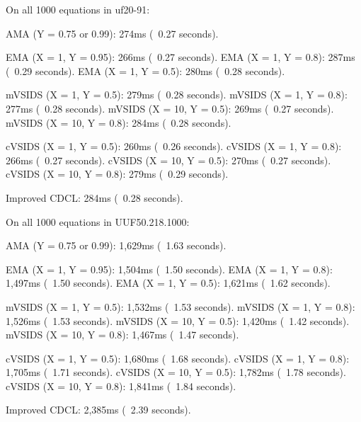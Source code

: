\begin{FVerbatim}
On all 1000 equations in uf20-91:

AMA (Y = 0.75 or 0.99):     274ms (~0.27 seconds).

EMA (X = 1, Y = 0.95):      266ms (~0.27 seconds).
EMA (X = 1, Y = 0.8):       287ms (~0.29 seconds).
EMA (X = 1, Y = 0.5):       280ms (~0.28 seconds).

mVSIDS (X = 1, Y = 0.5):    279ms (~0.28 seconds).
mVSIDS (X = 1, Y = 0.8):    277ms (~0.28 seconds).
mVSIDS (X = 10, Y = 0.5):   269ms (~0.27 seconds).
mVSIDS (X = 10, Y = 0.8):   284ms (~0.28 seconds).

cVSIDS (X = 1, Y = 0.5):    260ms (~0.26 seconds).
cVSIDS (X = 1, Y = 0.8):    266ms (~0.27 seconds).
cVSIDS (X = 10, Y = 0.5):   270ms (~0.27 seconds).
cVSIDS (X = 10, Y = 0.8):   279ms (~0.29 seconds).

Improved CDCL:              284ms (~0.28 seconds).

On all 1000 equations in UUF50.218.1000:

AMA (Y = 0.75 or 0.99):     1,629ms (~1.63 seconds).

EMA (X = 1, Y = 0.95):      1,504ms (~1.50 seconds).
EMA (X = 1, Y = 0.8):       1,497ms (~1.50 seconds).
EMA (X = 1, Y = 0.5):       1,621ms (~1.62 seconds).

mVSIDS (X = 1, Y = 0.5):    1,532ms (~1.53 seconds).
mVSIDS (X = 1, Y = 0.8):    1,526ms (~1.53 seconds).
mVSIDS (X = 10, Y = 0.5):   1,420ms (~1.42 seconds).
mVSIDS (X = 10, Y = 0.8):   1,467ms (~1.47 seconds).

cVSIDS (X = 1, Y = 0.5):    1,680ms (~1.68 seconds).
cVSIDS (X = 1, Y = 0.8):    1,705ms (~1.71 seconds).
cVSIDS (X = 10, Y = 0.5):   1,782ms (~1.78 seconds).
cVSIDS (X = 10, Y = 0.8):   1,841ms (~1.84 seconds).

Improved CDCL:              2,385ms (~2.39 seconds).
\end{FVerbatim}
\noindent